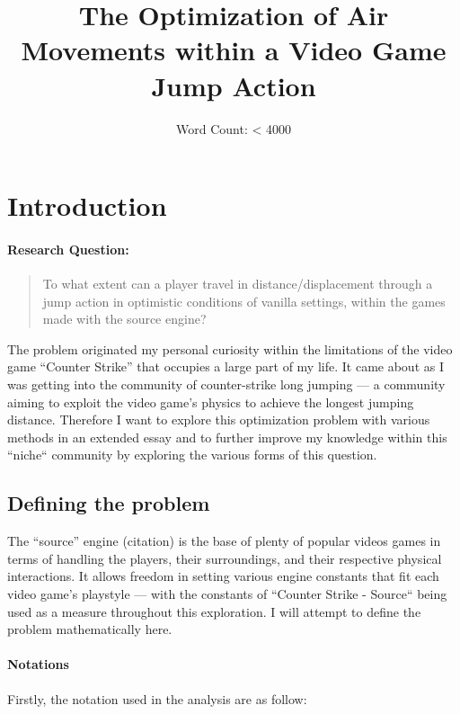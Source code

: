 \documentclass[a4paper,12pt]{article}
\title{The Optimization of Air Movements within a Video Game Jump Action}
\author{Word Count: < 4000}
\date{}
\begin{document}
    \maketitle

    \newpage

    \tableofcontents

    \newpage

\section{Introduction}

\paragraph{Research Question:}
\begin{quote}
    To what extent can a player travel in distance/displacement through a jump action in optimistic conditions of vanilla settings, within the games made with the source engine?
\end{quote}

The problem originated my personal curiosity within the limitations of the video game ``Counter Strike'' that occupies a large part of my life. It came about as I was getting into the community of counter-strike long jumping --- a community aiming to exploit the video game's physics to achieve the longest jumping distance. Therefore I want to explore this optimization problem with various methods in an extended essay and to further improve my knowledge within this ``niche`` community by exploring the various forms of this question.

\subsection{Defining the problem}
The ``source'' engine (citation) is the base of plenty of popular videos games in terms of handling the players, their surroundings, and their respective physical interactions. It allows freedom in setting various engine constants that fit each video game's playstyle --- with the constants of ``Counter Strike - Source`` being used as a measure throughout this exploration. I will attempt to define the problem mathematically here.

\paragraph{Notations} Firstly, the notation used in the analysis are as follow:
\end{document}
